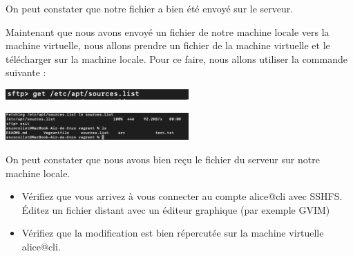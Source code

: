 \documentclass[12pt]{article}
\begin{document}
\vspace{0.3cm}

On peut constater que notre fichier a bien été envoyé sur le serveur.

\vspace{0.3cm}

Maintenant que nous avons envoyé un fichier de notre machine locale vers la machine virtuelle, nous allons prendre un fichier de la machine virtuelle et le télécharger sur la machine locale. Pour ce faire, nous allons utiliser la commande suivante :

\vspace{0.3cm}

\begin{center}
  \includegraphics[width=7cm]{Images-Client-SSH/Image-TD-SSH-4/commande-puts.png}
\end{center}

\vspace{0.3cm}

\begin{center}
  \includegraphics[width=7cm]{Images-Client-SSH/Image-TD-SSH-4/commande-puts-2.png}
\end{center}

\vspace{0.3cm}

On peut constater que nous avons bien reçu le fichier du serveur sur notre machine locale.

\vspace{0.3cm}

\begin{itemize}
  \item Vérifiez que vous arrivez à vous connecter au compte alice@cli avec SSHFS. \\
  Éditez un fichier distant avec un éditeur graphique (par exemple GVIM)
\end{itemize}

\vspace{0.3cm}

\begin{itemize}
    \item Vérifiez que la modification est bien répercutée sur la machine virtuelle alice@cli.
\end{itemize}
\end{document}
